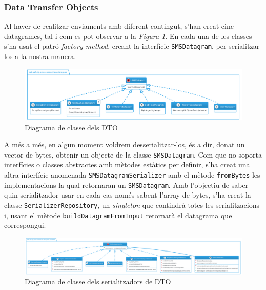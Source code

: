 \subsubsection{Data Transfer Objects}
Al haver de realitzar enviaments amb diferent contingut, s'han creat cinc datagrames, tal i com es pot observar a la \textit{Figura \ref{fig:dto}}. En cada una de les classes s'ha usat el patró \textit{factory method}, creant la interfície \texttt{SMSDatagram}, per serialitzar-los a la nostra manera.
\begin{figure}[H]
	\centering
	\includegraphics[width=16cm]{classes/dto.png}
	\caption{Diagrama de classe dels DTO}
	\label{fig:dto}
\end{figure}
A més a més, en algun moment voldrem desserialitzar-los, és a dir, donat un vector de bytes, obtenir un objecte de la classe \texttt{SMSDatagram}. Com que \texttt{\java } no soporta interfícies o classes abstractes amb mètodes estàtics per definir, s'ha creat una altra interfície anomenada \texttt{SMSDatagramSerializer} amb el mètode \texttt{fromBytes} les implementacions la qual retornaran un \texttt{SMSDatagram}. Amb l'objectiu de saber quin serialitzador usar en cada cas només sabent l'array de bytes, s'ha creat la classe \texttt{SerializerRepository}, un \textit{singleton} que contindrà totes les serialitzacions i, usant el mètode \texttt{buildDatagramFromInput} retornarà el datagrama que correspongui.
\begin{figure}[H]
	\centering
	\includegraphics[width=16cm]{classes/dtoser.png}
	\caption{Diagrama de classe dels serialitzadors de DTO}
	\label{fig:dtoser}
\end{figure}


